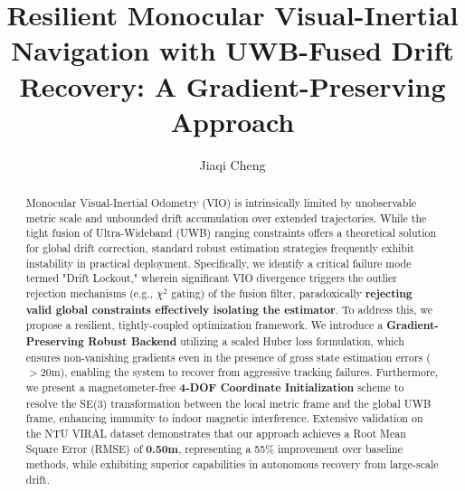 \documentclass{svproc}
\begin{document}
\mainmatter              %
%
\title{Resilient Monocular Visual-Inertial Navigation with UWB-Fused Drift Recovery: A Gradient-Preserving Approach}
%
%
\author{Jiaqi Cheng}
%
%
%

\maketitle              %

\begin{abstract}    
Monocular Visual-Inertial Odometry (VIO) is intrinsically limited by unobservable metric scale and unbounded drift accumulation over extended trajectories. While the tight fusion of Ultra-Wideband (UWB) ranging constraints offers a theoretical solution for global drift correction, standard robust estimation strategies frequently exhibit instability in practical deployment. Specifically, we identify a critical failure mode termed "Drift Lockout," wherein significant VIO divergence triggers the outlier rejection mechanisms (e.g., $\chi^2$ gating) of the fusion filter, paradoxically \textbf{rejecting valid global constraints effectively isolating the estimator}. To address this, we propose a resilient, tightly-coupled optimization framework. We introduce a \textbf{Gradient-Preserving Robust Backend} utilizing a scaled Huber loss formulation, which ensures non-vanishing gradients even in the presence of gross state estimation errors ($>20$m), enabling the system to recover from aggressive tracking failures. Furthermore, we present a magnetometer-free \textbf{4-DOF Coordinate Initialization} scheme to resolve the SE(3) transformation between the local metric frame and the global UWB frame, enhancing immunity to indoor magnetic interference. Extensive validation on the NTU VIRAL dataset demonstrates that our approach achieves a Root Mean Square Error (RMSE) of \textbf{0.50m}, representing a 55\% improvement over baseline methods, while exhibiting superior capabilities in autonomous recovery from large-scale drift.
\end{abstract}
%
\end{document}
